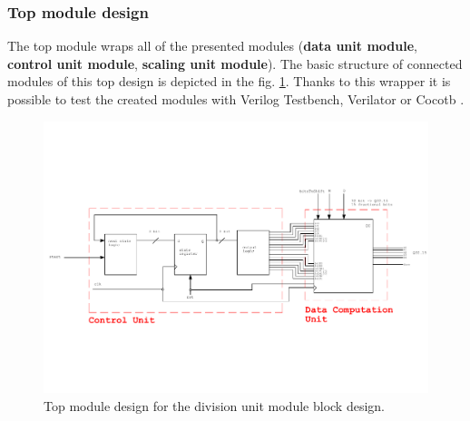 \documentclass[a4paper, twoside, 11pt]{article}
\newcommand{\fbar}{\FloatBarrier}
\begin{document}
\subsubsection{Top module design}\label{subsubsec:division-top-module-design}
The top module wraps all of the presented modules (\textbf{data unit module}, \textbf{control unit module}, \textbf{scaling unit module}). The basic structure of connected modules of this top design is depicted in the fig. \ref{fig:division-top-module}. Thanks to this wrapper it is possible to test the created modules with Verilog Testbench, Verilator \cite{verilator} or Cocotb \cite{cocotb}.
\begin{figure}[htbp!]
  \centering
  \includegraphics[width=1\textwidth]{src/pdf/top-module.pdf}
   \caption{Top module design for the division unit module block design.}
  \label{fig:division-top-module}
\end{figure}



\fbar
\end{document}
